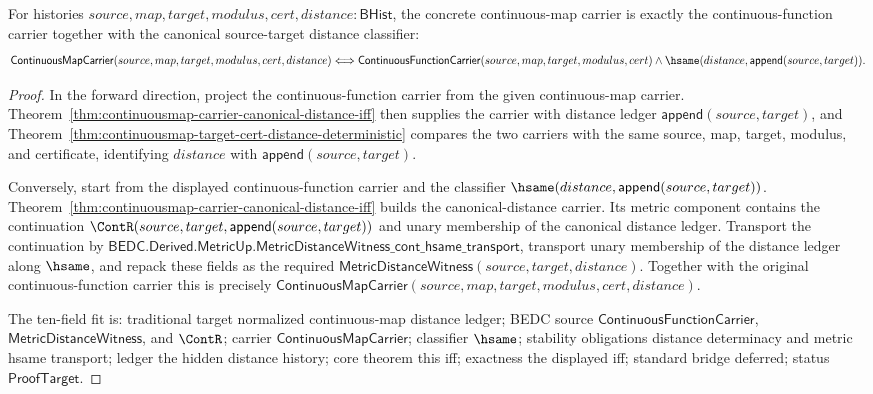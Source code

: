 \begin{theorem}
\label{thm:continuousmap-carrier-canonical-distance-exactness}
For histories $source,map,target,modulus,cert,distance:\mathsf{BHist}$,
the concrete continuous-map carrier is exactly the continuous-function carrier
together with the canonical source-target distance classifier:
$$
\mathsf{ContinuousMapCarrier}(source,map,target,modulus,cert,distance)
\Longleftrightarrow
\mathsf{ContinuousFunctionCarrier}(source,map,target,modulus,cert)\land
\hsame(distance,\mathsf{append}(source,target)).
$$
\end{theorem}
\begin{proof}
In the forward direction, project the continuous-function carrier from the
given continuous-map carrier. Theorem~\ref{thm:continuousmap-carrier-canonical-distance-iff}
then supplies the carrier with distance ledger
$\mathsf{append}(source,target)$, and
Theorem~\ref{thm:continuousmap-target-cert-distance-deterministic} compares
the two carriers with the same source, map, target, modulus, and certificate,
identifying $distance$ with $\mathsf{append}(source,target)$.

Conversely, start from the displayed continuous-function carrier and the
classifier $\hsame(distance,\mathsf{append}(source,target))$.
Theorem~\ref{thm:continuousmap-carrier-canonical-distance-iff} builds the
canonical-distance carrier. Its metric component contains the continuation
$\ContR(source,target,\mathsf{append}(source,target))$ and unary membership of
the canonical distance ledger. Transport the continuation by
$\mathsf{BEDC.Derived.MetricUp.MetricDistanceWitness\_cont\_hsame\_transport}$,
transport unary membership of the distance ledger along $\hsame$, and repack
these fields as the required $\mathsf{MetricDistanceWitness}(source,target,distance)$.
Together with the original continuous-function carrier this is precisely
$\mathsf{ContinuousMapCarrier}(source,map,target,modulus,cert,distance)$.

The ten-field fit is: traditional target normalized continuous-map distance
ledger; BEDC source $\mathsf{ContinuousFunctionCarrier}$,
$\mathsf{MetricDistanceWitness}$, and $\ContR$; carrier
$\mathsf{ContinuousMapCarrier}$; classifier $\hsame$; stability obligations
distance determinacy and metric hsame transport; ledger the hidden distance
history; core theorem this iff; exactness the displayed iff; standard bridge
deferred; status $\mathsf{ProofTarget}$.
\end{proof}

